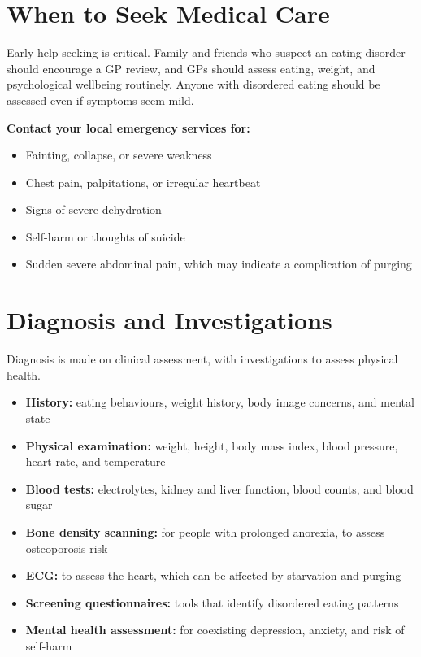 \section*{When to Seek Medical Care}
Early help-seeking is critical. Family and friends who suspect an eating disorder should encourage a GP review, and GPs should assess eating, weight, and psychological wellbeing routinely. Anyone with disordered eating should be assessed even if symptoms seem mild.

\textbf{Contact your local emergency services for:}
\begin{itemize}
    \item Fainting, collapse, or severe weakness
    \item Chest pain, palpitations, or irregular heartbeat
    \item Signs of severe dehydration
    \item Self-harm or thoughts of suicide
    \item Sudden severe abdominal pain, which may indicate a complication of purging
\end{itemize}

\section*{Diagnosis and Investigations}
Diagnosis is made on clinical assessment, with investigations to assess physical health.
\begin{itemize}
    \item \textbf{History:} eating behaviours, weight history, body image concerns, and mental state
    \item \textbf{Physical examination:} weight, height, body mass index, blood pressure, heart rate, and temperature
    \item \textbf{Blood tests:} electrolytes, kidney and liver function, blood counts, and blood sugar
    \item \textbf{Bone density scanning:} for people with prolonged anorexia, to assess osteoporosis risk
    \item \textbf{ECG:} to assess the heart, which can be affected by starvation and purging
    \item \textbf{Screening questionnaires:} tools that identify disordered eating patterns
    \item \textbf{Mental health assessment:} for coexisting depression, anxiety, and risk of self-harm
\end{itemize}

